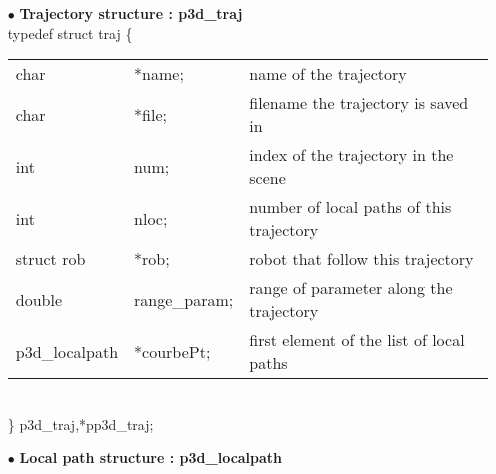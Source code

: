 \begin{itemize}
\item[$\bullet$]{\bf Trajectory structure : p3d\_traj} \\

typedef struct traj \{\\
\begin{tabular}{l l l}
  char       & *name; & name of the trajectory \\
  char       & *file; & filename the trajectory is saved in \\
  int        & num; & index of the trajectory in the scene\\
  int        & nloc; & number of local paths of this trajectory\\
  struct rob & *rob; & robot that follow this trajectory\\ 
  double     & range\_param; & range of parameter along the trajectory \\
  p3d\_localpath & *courbePt; & first element of the list of local paths \\
\end{tabular}\\
\} p3d\_traj,*pp3d\_traj;\\

\item[$\bullet$]{\bf Local path structure : p3d\_localpath} \\


\end{itemize}

